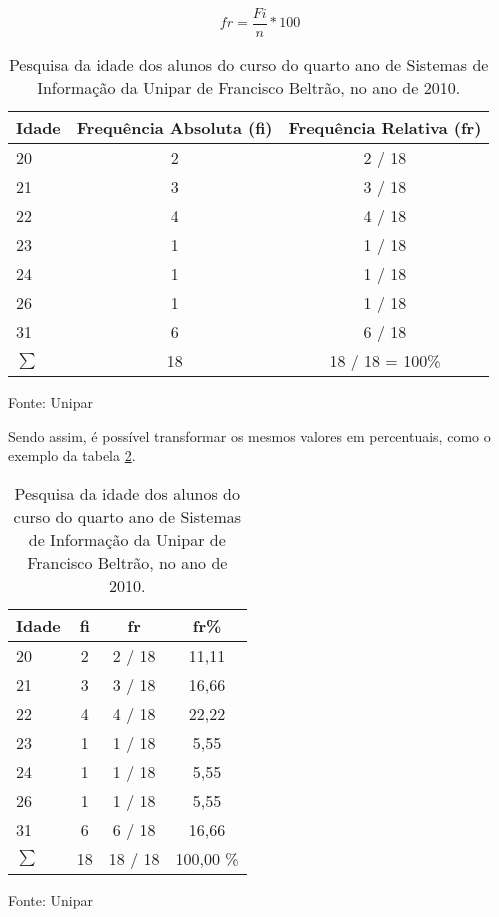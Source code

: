 \documentclass[espaco=simples,appendix=Name]{abnt}
\newcommand{\code}[1] {\textbf{#1}}
\begin{document}
\begin{equation}
\label{fr}
fr = \frac{Fi}{n} * 100
\end{equation} 

\begin{table}
\caption{Pesquisa da idade dos alunos do curso do quarto ano de Sistemas de Informação da Unipar de Francisco Beltrão, no ano de 2010.}
\label{tabela FR}
\begin{tabular}{|l|c|c|} 
\hline 
Idade & Frequência Absoluta (\code{fi}) & Frequência Relativa (\code{fr}) \\ \hline 
20    &               2                   &              2 / 18 \\ 
21    &               3                   &              3 / 18 \\
22    &               4                   &              4 / 18 \\
23    &               1                   &              1 / 18 \\
24    &               1                   &              1 / 18 \\
26    &               1                   &              1 / 18 \\
31    &               6                   &              6 / 18 \\ 
\hline 
\begin{math}
\sum 
\end{math} & 18 & 18 / 18 = 100\% \\
\hline 
\end{tabular}
\small{Fonte: Unipar}
\end{table}

Sendo assim, é possível transformar os mesmos valores em percentuais, como o exemplo da tabela \ref{tabela FR percentual}.

\begin{table}
\caption{Pesquisa da idade dos alunos do curso do quarto ano de Sistemas de Informação da Unipar de Francisco Beltrão, no ano de 2010.}
\label{tabela FR percentual}
\begin{tabular}{|l|c|c|c|} 
\hline 

Idade &  \code{fi} & \code{fr}  & \code{fr\%} \\ \hline 
20    &      2       &      2 / 18  &   11,11  \\ 
21    &      3       &      3 / 18  &   16,66  \\
22    &      4       &      4 / 18  &   22,22  \\
23    &      1       &      1 / 18  &    5,55  \\
24    &      1       &      1 / 18  &    5,55  \\
26    &      1       &      1 / 18  &    5,55  \\
31    &      6       &      6 / 18  &   16,66  \\ 
\hline 
\begin{math}
\sum 
\end{math} & 18      &     18 / 18  & 100,00 \% \\
\hline 
\end{tabular}
\small{Fonte: Unipar}
\end{table}
\end{document}

